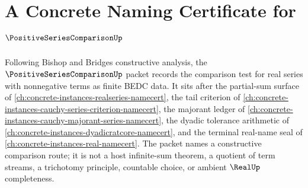 \chapter{A Concrete Naming Certificate for $\PositiveSeriesComparisonUp$}
\label{ch:concrete-instances-positive-series-comparison-namecert}

Following Bishop and Bridges constructive analysis, the $\PositiveSeriesComparisonUp$ packet records the comparison test for real series with nonnegative terms as finite BEDC data. It sits after the partial-sum surface of \autoref{ch:concrete-instances-realseries-namecert}, the tail criterion of \autoref{ch:concrete-instances-cauchy-series-criterion-namecert}, the majorant ledger of \autoref{ch:concrete-instances-cauchy-majorant-series-namecert}, the dyadic tolerance arithmetic of \autoref{ch:concrete-instances-dyadicratcore-namecert}, and the terminal real-name seal of \autoref{ch:concrete-instances-real-namecert}. The packet names a constructive comparison route; it is not a host infinite-sum theorem, a quotient of term streams, a trichotomy principle, countable choice, or ambient $\RealUp$ completeness.

